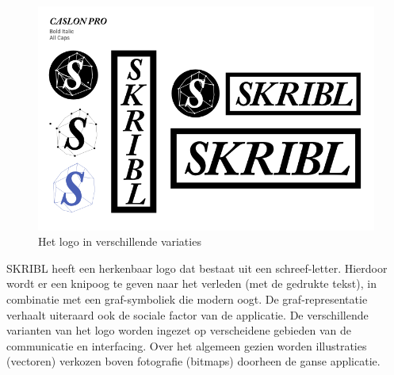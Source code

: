 \documentclass{article}
\begin{document}
\begin{appendices}
\begin{figure}[!h]
\centering
 \includegraphics[width=145mm]{pieteruploads/SKRBL_FRNT_Logo.png}
 \caption{Het logo in verschillende variaties}
\end{figure}

SKRIBL heeft een herkenbaar logo dat bestaat uit een schreef-letter. Hierdoor wordt er een knipoog te geven naar het verleden (met de gedrukte tekst), in combinatie met een graf-symboliek die modern oogt. De graf-representatie verhaalt uiteraard ook de sociale factor van de applicatie. De verschillende varianten van het logo worden ingezet op verscheidene gebieden van de communicatie en interfacing. Over het algemeen gezien worden illustraties (vectoren) verkozen boven fotografie (bitmaps) doorheen de ganse applicatie.

\clearpage


\end{appendices}
\end{document}
